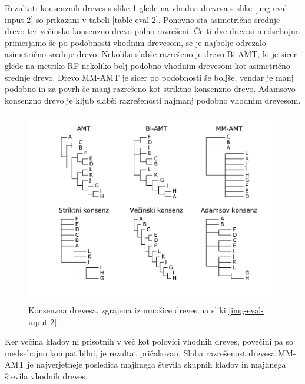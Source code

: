 \documentclass[a4paper, 12pt]{book}
\begin{document}
\noindent Rezultati konsenznih dreves s slike \ref{img-eval-result-2} glede na vhodna 
drevesa s slike \ref{img-eval-input-2} so prikazani v tabeli \ref{table-eval-2}. 
Ponovno sta asimetrično srednje drevo ter večinsko konsenzno drevo polno 
razrešeni. Če ti dve drevesi medsebojno primerjamo še po podobnosti vhodnim 
drevesom, se je najbolje odrezalo asimetrično srednje drevo. Nekoliko slabše 
razrešeno je drevo Bi-AMT, ki je sicer glede na metriko RF nekoliko bolj 
podobno vhodnim drevesom kot asimetrično srednje drevo. Drevo MM-AMT je sicer
po podobnosti še boljše, vendar je manj podobno in za povrh še manj razrešeno
kot striktno konsenzno drevo. Adamsovo konsenzno drevo je kljub slabši razrešenosti
najmanj podobno vhodnim drevesom.

\begin{figure}[h!]
	\begin{center}
		\includegraphics[scale=0.64, clip=true, trim=1.5cm 1.5cm 1cm 0.8cm]{gfx/eval_gfx_2.pdf}
	\end{center}
	\caption{Konsenzna drevesa, zgrajena iz množice dreves na sliki \ref{img-eval-input-2}.}
	\label{img-eval-result-2}
\end{figure}

Ker večina kladov ni prisotnih v več kot polovici vhodnih dreves, povečini pa so 
medsebojno kompatibilni, je rezultat pričakovan. Slaba razrešenost drevesa MM-AMT 
je najverjetneje posledica majhnega števila skupnih kladov in majhnega števila
vhodnih dreves. 
\end{document}
